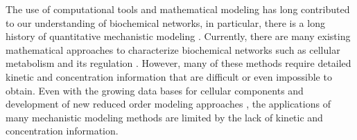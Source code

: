 \documentclass[12pt]{article}
\begin{document}
The use of computational tools and mathematical modeling has long contributed to our understanding of biochemical networks, in particular, there is a long history of quantitative mechanistic modeling \cite{bailey1998mathematical}. Currently, there are many existing mathematical approaches to characterize biochemical networks such as cellular metabolism and its regulation \cite{castellanos2004modular,fell1997understanding,domach1984computer,barkal1997robustness,liao1993modelling,novak1999finishing,kompala1986investigation,palsson1987reducing,conrado2007stochastic,wayman2015dynamic}. However, many of these methods require detailed kinetic and concentration information that are difficult or even impossible to obtain. Even with the growing data bases for cellular components and development of new reduced order modeling approaches \cite{sagar2015dynamic}, the applications of many mechanistic modeling methods are limited by the lack of kinetic and concentration information. 
\end{document}
